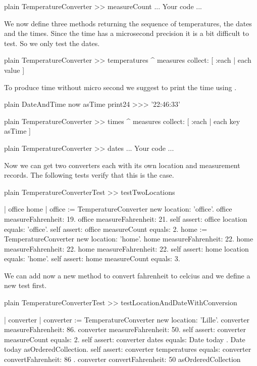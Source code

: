 \documentclass[10pt,twoside,english]{_support/latex/sbabook/sbabook}
\begin{document}
\begin{displaycode}{plain}
TemperatureConverter >> measureCount
	... Your code ...
\end{displaycode}

We now define three methods returning the sequence of temperatures, the dates and the times. 
Since the time has a microsecond precision it is a bit difficult to test. So we only test the dates. 

\begin{displaycode}{plain}
TemperatureConverter >> temperatures
	^ measures collect: [ :each | each value ]
\end{displaycode}

To produce time without micro second we suggest to print the time using .

\begin{displaycode}{plain}
DateAndTime now asTime print24
>>> '22:46:33'
\end{displaycode}

\begin{displaycode}{plain}
TemperatureConverter >> times
	^ measures collect: [ :each | each key asTime ]
\end{displaycode}

\begin{displaycode}{plain}
TemperatureConverter >> dates
	... Your code ...
\end{displaycode}

Now we can get two converters each with its own location and measurement records. 
The following tests verify that this is the case. 

\begin{displaycode}{plain}
TemperatureConverterTest >> testTwoLocations

	| office home |
	office := TemperatureConverter new location: 'office'. 
	office measureFahrenheit: 19.
	office measureFahrenheit: 21.
	self assert: office location equals: 'office'.
	self assert: office measureCount equals: 2. 
	home := TemperatureConverter new location: 'home'. 
	home measureFahrenheit: 22.
	home measureFahrenheit: 22.
	home measureFahrenheit: 22.
	self assert: home location equals: 'home'.
	self assert: home measureCount equals: 3.
\end{displaycode}

We can add now a new method to convert fahrenheit to celcius and we define a new test first.

\begin{displaycode}{plain}
TemperatureConverterTest >> testLocationAndDateWithConversion

	| converter |
	converter := TemperatureConverter new location: 'Lille'. 
	converter measureFahrenheit: 86.
	converter measureFahrenheit: 50.
	self assert: converter measureCount equals: 2.
	self assert: converter dates 
		equals: {Date today . Date today} asOrderedCollection.
	self assert: converter temperatures 
		equals: { converter convertFahrenheit: 86 . 
				converter convertFahrenheit: 50 } asOrderedCollection
\end{displaycode}
\end{document}
